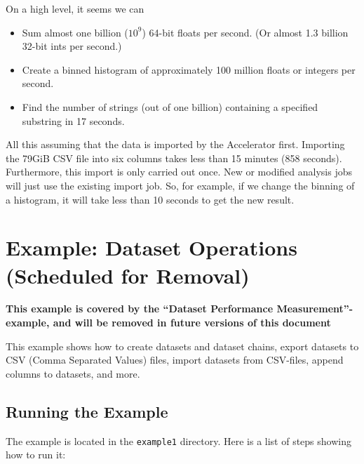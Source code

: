 \documentclass[a4paper]{article}
\begin{document}
On a high level, it seems we can
\begin{itemize}
\item Sum almost one billion ($10^9$) 64-bit floats per second.  (Or
  almost 1.3 billion 32-bit ints per second.)
\item Create a binned histogram of approximately 100 million floats or
  integers per second.
\item Find the number of strings (out of one billion) containing a specified substring in 17 seconds.
\end{itemize}
All this assuming that the data is imported by the Accelerator first.
Importing the 79GiB CSV file into six columns takes less than 15
minutes (858 seconds).  Furthermore, this import is only carried out
once.  New or modified analysis jobs will just use the existing import
job.  So, for example, if we change the binning of a histogram, it
will take less than 10 seconds to get the new result.



\clearpage
\section*{Example:  Dataset Operations (Scheduled for Removal)}

\textbf{This example is covered by the ``Dataset Performance
  Measurement''-example, and will be removed in future versions of
  this document}

This example shows how to create datasets and dataset chains, export
datasets to CSV (Comma Separated Values) files, import datasets from
CSV-files, append columns to datasets, and more.

\subsection*{Running the Example}
The example is located in the \texttt{example1} directory.  Here is a
list of steps showing how to run it:
\end{document}
